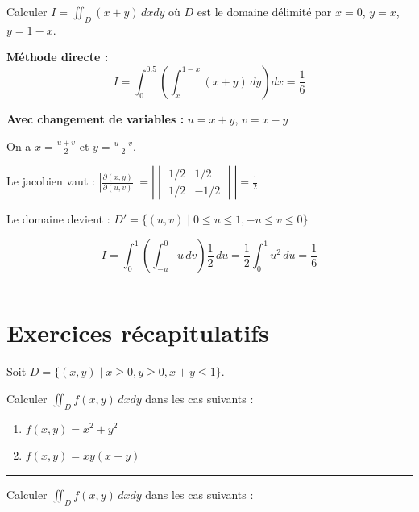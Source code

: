 \documentclass[../PolyS2.tex]{subfiles}
\begin{document}
\begin{Ex}
Calculer $I = \displaystyle\iint_D (x+y) \, dxdy$ où $D$ est le domaine délimité par $x = 0$, $y = x$, $y = 1-x$.

\vspace{1em}

\textbf{Méthode directe :}
$$I = \int_0^{0.5} \left(\int_x^{1-x} (x+y) \, dy\right) dx = \frac{1}{6}$$

\vspace{1em}

\textbf{Avec changement de variables :} $u = x+y$, $v = x-y$

On a $x = \frac{u+v}{2}$ et $y = \frac{u-v}{2}$.

Le jacobien vaut : $\left|\frac{\partial(x,y)}{\partial(u,v)}\right| = \left|\begin{vmatrix} 1/2 & 1/2 \\ 1/2 & -1/2 \end{vmatrix}\right| = \frac{1}{2}$

Le domaine devient : $D' = \{(u,v) \mid 0 \leq u \leq 1, -u \leq v \leq 0\}$

$$I = \int_0^1 \left(\int_{-u}^0 u \, dv\right) \frac{1}{2} \, du = \frac{1}{2} \int_0^1 u^2 \, du = \frac{1}{6}$$
\end{Ex}

\vspace{1em}\hrule\vspace{1em}

\newpage

\section{Exercices récapitulatifs}


Soit $D = \{(x,y) \mid x \geq 0, y \geq 0, x+y \leq 1\}$.

Calculer $\displaystyle\iint_D f(x,y) \, dxdy$ dans les cas suivants :
\begin{enumerate}
\item $f(x,y) = x^2 + y^2$
\item $f(x,y) = xy(x+y)$
\end{enumerate}

\vspace{1em}\hrule\vspace{1em}


Calculer $\displaystyle\iint_D f(x,y) \, dxdy$ dans les cas suivants :
\end{document}
